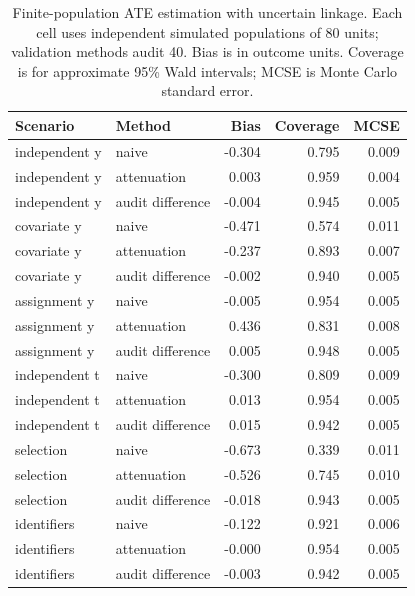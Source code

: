 \begin{table}[htbp]\centering\small
\caption{Finite-population ATE estimation with uncertain linkage. Each cell uses independent simulated populations of 80 units; validation methods audit 40. Bias is in outcome units. Coverage is for approximate 95\% Wald intervals; MCSE is Monte Carlo standard error.}
\begin{tabular}{llrrr}\toprule
Scenario & Method & Bias & Coverage & MCSE\\\midrule
independent y & naive & -0.304 & 0.795 & 0.009\\
independent y & attenuation & 0.003 & 0.959 & 0.004\\
independent y & audit difference & -0.004 & 0.945 & 0.005\\
covariate y & naive & -0.471 & 0.574 & 0.011\\
covariate y & attenuation & -0.237 & 0.893 & 0.007\\
covariate y & audit difference & -0.002 & 0.940 & 0.005\\
assignment y & naive & -0.005 & 0.954 & 0.005\\
assignment y & attenuation & 0.436 & 0.831 & 0.008\\
assignment y & audit difference & 0.005 & 0.948 & 0.005\\
independent t & naive & -0.300 & 0.809 & 0.009\\
independent t & attenuation & 0.013 & 0.954 & 0.005\\
independent t & audit difference & 0.015 & 0.942 & 0.005\\
selection & naive & -0.673 & 0.339 & 0.011\\
selection & attenuation & -0.526 & 0.745 & 0.010\\
selection & audit difference & -0.018 & 0.943 & 0.005\\
identifiers & naive & -0.122 & 0.921 & 0.006\\
identifiers & attenuation & -0.000 & 0.954 & 0.005\\
identifiers & audit difference & -0.003 & 0.942 & 0.005\\
\bottomrule\end{tabular}
\end{table}
